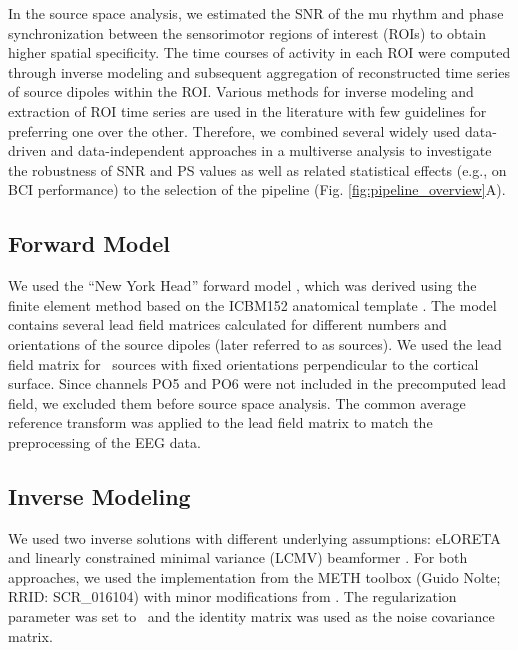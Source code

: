 \medskip

In the source space analysis, we estimated the SNR of the mu rhythm and phase synchronization between the sensorimotor regions of interest (ROIs) to obtain higher spatial specificity. The time courses of activity in each ROI were computed through inverse modeling and subsequent aggregation of reconstructed time series of source dipoles within the ROI. Various methods for inverse modeling and extraction of ROI time series are used in the literature with few guidelines for preferring one over the other. Therefore, we combined several widely used data-driven and data-independent approaches in a multiverse analysis \citep{Steegen2016} to investigate the robustness of SNR and PS values as well as related statistical effects (e.g., on BCI performance) to the selection of the pipeline (Fig. \ref{fig:pipeline_overview}A).

\subsection{Forward Model}

We used the ``New York Head'' forward model \citep{Huang2016NYHead}, which was derived using the finite element method based on the ICBM152 anatomical template \citep{Fonov2009, Fonov2011}. The model contains several lead field matrices calculated for different numbers and orientations of the source dipoles (later referred to as sources). We used the lead field matrix for \numVoxels~sources with fixed orientations perpendicular to the cortical surface. Since channels PO5 and PO6 were not included in the precomputed lead field, we excluded them before source space analysis. The common average reference transform was applied to the lead field matrix to match the preprocessing of the EEG data.

\subsection{Inverse Modeling}

We used two inverse solutions with different underlying assumptions: eLORETA \citep{eLORETA_PascualMarqui2007} and linearly constrained minimal variance (LCMV) beamformer \citep{LCMV_VanVeen1997}. For both approaches, we used the implementation from the METH toolbox (Guido Nolte; RRID: SCR\_016104) with minor modifications from \citep{HaufeEwald2019}. The regularization parameter was set to \inverseRegFactor~and the identity matrix was used as the noise covariance matrix. 

